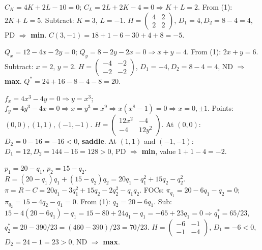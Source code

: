 \begin{solutions}
    \item $C_K = 4 K + 2 L - 10 = 0$; $C_L = 2 L + 2 K - 4 = 0 \Rightarrow K + L = 2$. From (1): $2 K + L = 5$. Subtract: $K = 3$, $L = -1$. $H = \begin{pmatrix} 4 & 2 \\ 2 & 2 \end{pmatrix}$, $D_1 = 4, D_2 = 8 - 4 = 4$, PD $\Rightarrow$ \textbf{min}. $C(3, -1) = 18 + 1 - 6 - 30 + 4 + 8 = -5$.
    \item $Q_x = 12 - 4 x - 2 y = 0$; $Q_y = 8 - 2 y - 2 x = 0 \Rightarrow x + y = 4$. From (1): $2 x + y = 6$. Subtract: $x = 2$, $y = 2$. $H = \begin{pmatrix} -4 & -2 \\ -2 & -2 \end{pmatrix}$, $D_1 = -4, D_2 = 8 - 4 = 4$, ND $\Rightarrow$ \textbf{max}. $Q^* = 24 + 16 - 8 - 4 - 8 = 20$.
    \item $f_x = 4 x^3 - 4 y = 0 \Rightarrow y = x^3$; $f_y = 4 y^3 - 4 x = 0 \Rightarrow x = y^3 = x^9 \Rightarrow x(x^8 - 1) = 0 \Rightarrow x = 0, \pm 1$. Points: $(0, 0), (1, 1), (-1, -1)$. $H = \begin{pmatrix} 12 x^2 & -4 \\ -4 & 12 y^2 \end{pmatrix}$. At $(0, 0)$: $D_2 = 0 - 16 = -16 < 0$, \textbf{saddle}. At $(1, 1)$ and $(-1, -1)$: $D_1 = 12, D_2 = 144 - 16 = 128 > 0$, PD $\Rightarrow$ \textbf{min}, value $1 + 1 - 4 = -2$.
    \item $p_1 = 20 - q_1$, $p_2 = 15 - q_2$. $R = (20 - q_1) q_1 + (15 - q_2) q_2 = 20 q_1 - q_1^2 + 15 q_2 - q_2^2$. $\pi = R - C = 20 q_1 - 3 q_1^2 + 15 q_2 - 2 q_2^2 - q_1 q_2$. FOCs: $\pi_{q_1} = 20 - 6 q_1 - q_2 = 0$; $\pi_{q_2} = 15 - 4 q_2 - q_1 = 0$. From (1): $q_2 = 20 - 6 q_1$. Sub: $15 - 4(20 - 6 q_1) - q_1 = 15 - 80 + 24 q_1 - q_1 = -65 + 23 q_1 = 0 \Rightarrow q_1^* = 65/23$, $q_2^* = 20 - 390/23 = (460 - 390)/23 = 70/23$. $H = \begin{pmatrix} -6 & -1 \\ -1 & -4 \end{pmatrix}$, $D_1 = -6 < 0$, $D_2 = 24 - 1 = 23 > 0$, ND $\Rightarrow$ \textbf{max}.


\end{solutions}
